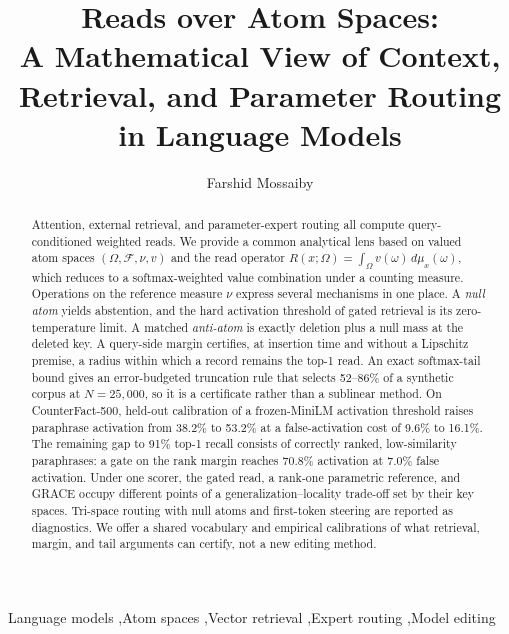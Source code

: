 \documentclass[preprint,12pt]{elsarticle}
\newcommand{\Om}{\Omega}
\begin{document}
\begin{frontmatter}

\title{Reads over Atom Spaces:\\
A Mathematical View of Context, Retrieval, and Parameter Routing in Language Models}

\author[inst1]{Farshid Mossaiby}

\begin{abstract}
Attention, external retrieval, and parameter-expert routing all compute query-conditioned weighted reads. We provide a common analytical lens based on valued atom spaces $(\Om,\mathcal F,\nu,v)$ and the read operator $R(x;\Om)=\int_\Om v(\omega)\,d\mu_x(\omega)$, which reduces to a softmax-weighted value combination under a counting measure. Operations on the reference measure $\nu$ express several mechanisms in one place. A \emph{null atom} yields abstention, and the hard activation threshold of gated retrieval is its zero-temperature limit. A matched \emph{anti-atom} is exactly deletion plus a null mass at the deleted key. A query-side margin certifies, at insertion time and without a Lipschitz premise, a radius within which a record remains the top-1 read. An exact softmax-tail bound gives an error-budgeted truncation rule that selects 52--86\% of a synthetic corpus at $N=25{,}000$, so it is a certificate rather than a sublinear method. On CounterFact-500, held-out calibration of a frozen-MiniLM activation threshold raises paraphrase activation from 38.2\% to 53.2\% at a false-activation cost of 9.6\% to 16.1\%. The remaining gap to 91\% top-1 recall consists of correctly ranked, low-similarity paraphrases: a gate on the rank margin reaches 70.8\% activation at 7.0\% false activation. Under one scorer, the gated read, a rank-one parametric reference, and GRACE occupy different points of a generalization--locality trade-off set by their key spaces. Tri-space routing with null atoms and first-token steering are reported as diagnostics. We offer a shared vocabulary and empirical calibrations of what retrieval, margin, and tail arguments can certify, not a new editing method.
\end{abstract}

\begin{keyword}
Language models \sep Atom spaces \sep Vector retrieval \sep Expert routing \sep Model editing
\end{keyword}

\end{frontmatter}
\end{document}
